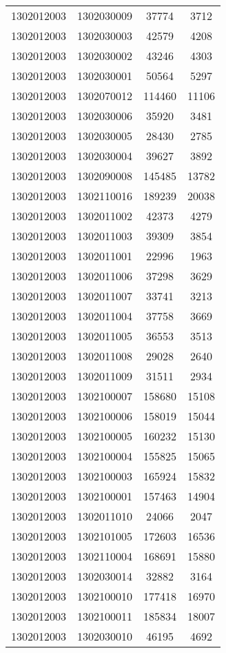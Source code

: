 \begin{longtable}[h]{llcc}
		1302012003 & 1302030009 & 37774 & 3712\\
		1302012003 & 1302030003 & 42579 & 4208\\
		1302012003 & 1302030002 & 43246 & 4303\\
		1302012003 & 1302030001 & 50564 & 5297\\
		1302012003 & 1302070012 & 114460 & 11106\\
		1302012003 & 1302030006 & 35920 & 3481\\
		1302012003 & 1302030005 & 28430 & 2785\\
		1302012003 & 1302030004 & 39627 & 3892\\
		1302012003 & 1302090008 & 145485 & 13782\\
		1302012003 & 1302110016 & 189239 & 20038\\
		1302012003 & 1302011002 & 42373 & 4279\\
		1302012003 & 1302011003 & 39309 & 3854\\
		1302012003 & 1302011001 & 22996 & 1963\\
		1302012003 & 1302011006 & 37298 & 3629\\
		1302012003 & 1302011007 & 33741 & 3213\\
		1302012003 & 1302011004 & 37758 & 3669\\
		1302012003 & 1302011005 & 36553 & 3513\\
		1302012003 & 1302011008 & 29028 & 2640\\
		1302012003 & 1302011009 & 31511 & 2934\\
		1302012003 & 1302100007 & 158680 & 15108\\
		1302012003 & 1302100006 & 158019 & 15044\\
		1302012003 & 1302100005 & 160232 & 15130\\
		1302012003 & 1302100004 & 155825 & 15065\\
		1302012003 & 1302100003 & 165924 & 15832\\
		1302012003 & 1302100001 & 157463 & 14904\\
		1302012003 & 1302011010 & 24066 & 2047\\
		1302012003 & 1302101005 & 172603 & 16536\\
		1302012003 & 1302110004 & 168691 & 15880\\
		1302012003 & 1302030014 & 32882 & 3164\\
		1302012003 & 1302100010 & 177418 & 16970\\
		1302012003 & 1302100011 & 185834 & 18007\\
		1302012003 & 1302030010 & 46195 & 4692\\

\end{longtable}

